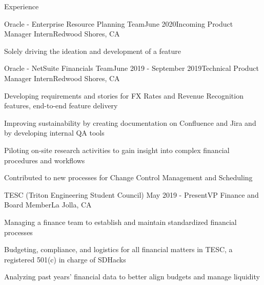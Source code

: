 \documentclass{resume} %
\begin{document}
\begin{rSection}{\faCode{ }}{Experience}

\begin{rSubsection}{}{Oracle - Enterprise Resource Planning Team}{June 2020}{Incoming Product Manager Intern}{Redwood Shores, CA}
\item Solely driving the ideation and development of a feature
\end{rSubsection}

\begin{rSubsection}{}{Oracle - NetSuite Financials Team}{June 2019 - September 2019}{Technical Product Manager Intern}{Redwood Shores, CA}
\item Developing requirements and stories for FX Rates and Revenue Recognition features, end-to-end feature delivery
\item Improving sustainability by creating documentation on Confluence and Jira and by developing internal QA tools 
\item Piloting on-site research activities to gain insight into complex financial procedures and workflows
\item Contributed to new processes for Change Control Management and Scheduling
\end{rSubsection}

\begin{rSubsection}{}{TESC (Triton Engineering Student Council) }{May 2019 - Present}{VP Finance and Board Member}{La Jolla, CA}
\item Managing a finance team to establish and maintain standardized financial processes
\item Budgeting, compliance, and logistics for all financial matters in TESC, a registered 501(c) in charge of SDHacks
\item Analyzing past years' financial data to better align budgets and manage liquidity
\end{rSubsection}

\iffalse
\begin{rSubsection}{}{University of California, San Diego}{June 2019 - Present}{Research Assistant}{La Jolla, CA}
\item Wrangling data using Tabula and cleaning data using pandas Python library
\item Assisting graduate student Alyssa Brown to publish a thesis focusing on the impact of school lunch programs
\end{rSubsection}


\begin{rSubsection}{}{REPS \& Company}{September 2018 - November 2018}{Market Analyst Intern}{San Diego, CA}
\item Implemented data analysis to manage an individual portfolio with >13\% returns
\item Facilitated ticket brokerage and performed market analysis for pricing and purchasing stock in live events
\end{rSubsection}
\fi



\end{rSection}
\end{document}

